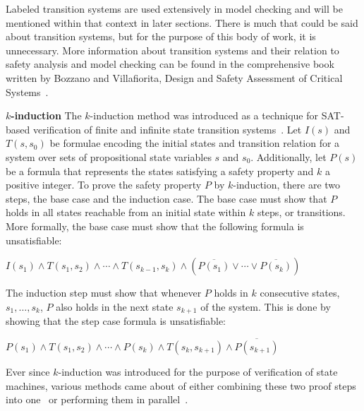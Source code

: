 Labeled transition systems are used extensively in model checking and will be mentioned within that context in later sections. There is much that could be said about transition systems, but for the purpose of this body of work, it is unnecessary. More information about transition systems and their relation to safety analysis and model checking can be found in the comprehensive book written by Bozzano and Villafiorita, Design and Safety Assessment of Critical Systems~\cite{Bozzano:2010:DSA:1951720}.

\textbf{$k$-induction}
\label{subsubsec:kInd}
The $k$-induction method was introduced as a technique for SAT-based verification of finite and infinite state transition systems~\cite{sheeran2000checking}. Let $I(s)$ and $T(s, s_0)$ be formulae encoding the initial states and transition relation for a system over sets of propositional state variables $s$ and $s_0$. Additionally, let $P(s)$ be a formula that represents the states satisfying a safety property and $k$ a positive integer. To prove the safety property $P$ by $k$-induction, there are two steps, the base case and the induction case. The base case must show that $P$ holds in all states reachable from an initial state within $k$ steps, or transitions. More formally, the base case must show that the following formula is unsatisfiable:

\begin{center}
$I(s_1) \land T(s_1, s_2) \land \cdots \land T(s_{k−1}, s_k) \land (\overline{P(s_1)} \lor \cdots \lor \overline{P(s_k)})$
\end{center}

The induction step must show that whenever $P$ holds in $k$ consecutive states, $s_1, \ldots, s_k$, $P$ also holds in the next state $s_{k+1}$ of the system. This is done by showing that the step case formula is unsatisfiable:

\begin{center}
$P(s_1) \land T(s_1, s_2) \land \cdots \land P(s_k) \land T(s_{k}, s_{k+1}) \land \overline{P(s_{k+1})}$
\end{center}

Ever since $k$-induction was introduced for the purpose of verification of state machines, various methods came about of either combining these two proof steps into one~\cite{donaldson2011software} or performing them in parallel~\cite{kahsai2011pkind}. \\